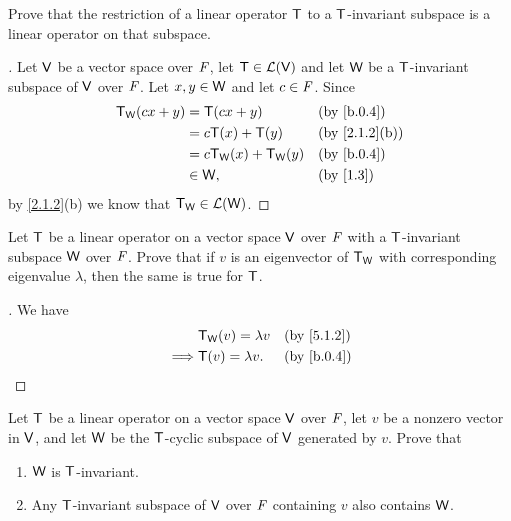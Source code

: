 \setcounter{ex}{6}
\begin{ex}\label{ex:5.4.7}
  Prove that the restriction of a linear operator \(\mathsf{T}\) to a \(\mathsf{T}\)-invariant subspace is a linear operator on that subspace.
\end{ex}

\begin{proof}[]
  Let \(\mathsf{V}\) be a vector space over \(\mathit{F}\), let \(\mathsf{T} \in \mathcal{L}(\mathsf{V})\) and let \(\mathsf{W}\) be a \(\mathsf{T}\)-invariant subspace of \(\mathsf{V}\) over \(\mathit{F}\).
  Let \(x, y \in \mathsf{W}\) and let \(c \in \mathit{F}\).
  Since
  \begin{align*}
    \T_{\W}(cx + y) & = \T(cx + y)                &  & \by{b.0.4}    \\
                    & = c \T(x) + \T(y)           &  & \by{2.1.2}[b] \\
                    & = c \T_{\W}(x) + \T_{\W}(y) &  & \by{b.0.4}    \\
                    & \in \W,                     &  & \by{1.3}
  \end{align*}
  by \cref{2.1.2}(b) we know that \(\mathsf{T}_{\mathsf{W}} \in \mathcal{L}(\mathsf{W})\).
\end{proof}

\begin{ex}\label{ex:5.4.8}
  Let \(\mathsf{T}\) be a linear operator on a vector space \(\mathsf{V}\) over \(\mathit{F}\) with a \(\mathsf{T}\)-invariant subspace \(\mathsf{W}\) over \(\mathit{F}\).
  Prove that if \(v\) is an eigenvector of \(\mathsf{T}_{\mathsf{W}}\) with corresponding eigenvalue \(\lambda\), then the same is true for \(\mathsf{T}\).
\end{ex}

\begin{proof}[]
  We have
  \begin{align*}
             & \T_{\W}(v) = \lambda v &  & \by{5.1.2} \\
    \implies & \T(v) = \lambda v.     &  & \by{b.0.4}
  \end{align*}
\end{proof}

\setcounter{ex}{10}
\begin{ex}\label{ex:5.4.11}
  Let \(\mathsf{T}\) be a linear operator on a vector space \(\mathsf{V}\) over \(\mathit{F}\), let \(v\) be a nonzero vector in \(\mathsf{V}\), and let \(\mathsf{W}\) be the \(\mathsf{T}\)-cyclic subspace of \(\mathsf{V}\) generated by \(v\).
  Prove that
  \begin{enumerate}
    \item \(\mathsf{W}\) is \(\mathsf{T}\)-invariant.
    \item Any \(\mathsf{T}\)-invariant subspace of \(\mathsf{V}\) over \(\mathit{F}\) containing \(v\) also contains \(\mathsf{W}\).
  \end{enumerate}
\end{ex}

